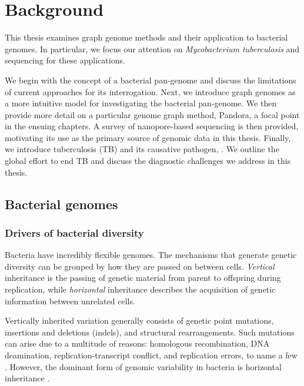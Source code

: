 \chapter{Background}

This thesis examines graph genome methods and their application to bacterial genomes. In particular, we focus our attention on \textit{Mycobacterium tuberculosis} and \ont{} sequencing for these applications. 

We begin with the concept of a bacterial pan-genome and discuss the limitations of current approaches for its interrogation. Next, we introduce graph genomes as a more intuitive model for investigating the bacterial pan-genome. We then provide more detail on a particular genome graph method, Pandora, a focal point in the ensuing chapters. A survey of nanopore-based sequencing is then provided, motivating its use as the primary source of genomic data in this thesis. Finally, we introduce tuberculosis (TB) and its causative pathogen, \mtb{}. We outline the global effort to end TB and discuss the diagnostic challenges we address in this thesis.

\section{Bacterial genomes}

\subsection{Drivers of bacterial diversity}

Bacteria have incredibly flexible genomes. The mechanisms that generate genetic diversity can be grouped by how they are passed on between cells. \emph{Vertical} inheritance is the passing of genetic material from parent to offspring during replication, while \emph{horizontal} inheritance describes the acquisition of genetic information between unrelated cells. 

Vertically inherited variation generally consists of genetic point mutations, insertions and deletions (indels), and structural rearrangements. Such mutations can arise due to a multitude of reasons: homologous recombination, DNA deamination, replication-transcript conflict, and replication errors, to name a few \cite{Lan2000}. However, the dominant form of genomic variability in bacteria is horizontal inheritance \cite{McInerney2017}.

